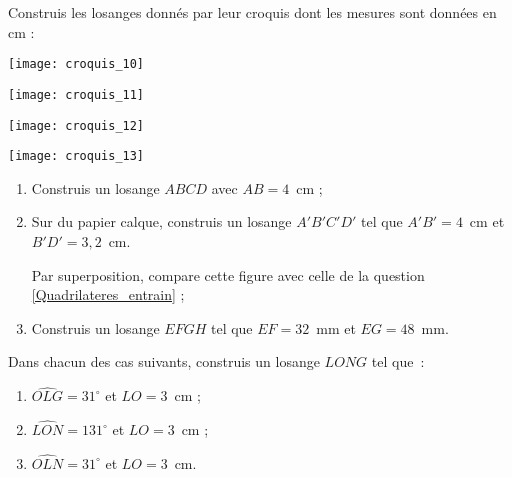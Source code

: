 \begin{exercice}
Construis les losanges donnés par leur croquis dont les mesures sont données en cm :
\begin{colenumerate}{2}
 \item
 
 \texttt{[image: croquis\_10]}
  \item
 
 \texttt{[image: croquis\_11]}
  \item
 
 \texttt{[image: croquis\_12]}
  \item
 
 \texttt{[image: croquis\_13]}
 \end{colenumerate}
\end{exercice}


\begin{exercice}[Losanges]
\begin{enumerate}
 \item Construis un losange $ABCD$ avec $AB = 4$ cm ; \label{Quadrilateres_entrain}
 \item Sur du papier calque, construis un losange $A'B'C'D'$ tel que $A'B' = 4$ cm et $B'D' = 3,2$ cm.
 
Par superposition, compare cette figure avec celle de la question \ref{Quadrilateres_entrain} ;
 \item Construis un losange $EFGH$ tel que $EF = 32$ mm et $EG = 48$ mm.
 \end{enumerate}
\end{exercice}


\begin{exercice}
Dans chacun des cas suivants, construis un losange $LONG$ tel que :
\begin{enumerate}
 \item $\widehat{OLG} = 31^\circ$ et $LO = 3$ cm ;
 \item $\widehat{LON} = 131^\circ$ et $LO = 3$ cm ;
 \item $\widehat{OLN} = 31^\circ$ et $LO = 3$ cm.
 \end{enumerate}
\end{exercice}



